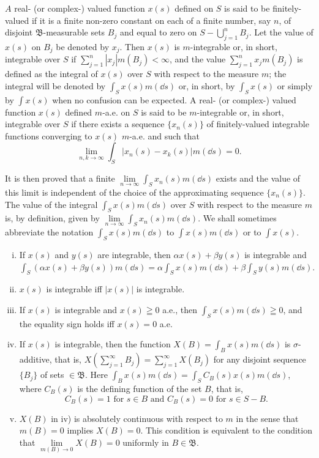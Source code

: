 
\begin{definitionu} $A$ real- (or complex-) valued function $x(s)$ defined on $S$ is said to be finitely-valued if it is a finite non-zero constant on each of a finite number, say $n$, of disjoint $\mathfrak{B}$-measurable sets $B_j$ and equal to zero on $S- \bigcup\limits_{j=1}^{n} B_j$. Let the value of $x(s)$ on $B_j$ be denoted by $x_j$. Then $x(s)$ is $m$-integrable or, in short, integrable over $S$ if $\sum\limits_{j=1}^{n} |x_j| m(B_j) < \infty$, and the value $\sum\limits_{j=1}^{n} x_j m(B_j)$ is defined as the integral of $x(s)$ over $S$ with respect to the measure $m$; the integral will be denoted by $\int_S x(s) m(\dd s)$ 
or, in short, by $\int_{S} x(s)$ or simply by $\int x(s)$ when no confusion can be expected. A real- (or complex-) valued function $x(s)$ defined $m$-a.e. on $S$ is said to be $m$-integrable or, in short, integrable over $S$ if there exists a sequence $\{x_n(s)\}$ of finitely-valued integrable functions converging to $x(s)$ $m$-a.e. and such that 
\[
\lim\limits _{n, k \rightarrow \infty} \int_{S} | x _{n} (s)- x _{k} (s) | m(\dd s) = 0.
\]
\end{definitionu}

It is then proved that a finite $\lim\limits_{n\to\infty}\int_{S}x_{n}(s)m(\dd s)$ exists and the value of this limit is independent of the choice of the approximating sequence $\{x_{n}(s)\}$. The value of the integral $\int_{S}x(s)m(\dd s)$ over $S$ with respect to the measure $m$ is, by definition, given by $\lim\limits_{n\to\infty}\int_{S}x_{n}(s)m(\dd s)$. We shall sometimes abbreviate the notation $\int_{S}x(s)m(\dd s)$ to $\int x(s)m(\dd s)$ or to $\int x(s)$. 


\begin{enumerate}[i)]
 \item If $x(s)$ and $y(s)$ are integrable, then $\alpha x(s) + \beta y(s)$ is integrable and $\int_{S} (\alpha x(s) + \beta y(s)) m(\dd s) = \alpha \int_{S} x(s) m(\dd s) + \beta \int_{S} y(s) m(\dd s).$ 
 \item $x(s)$ is integrable iff $|x(s)|$ is integrable. 
 \item If $x(s)$ is integrable and $x(s) \geqq 0$ a.e., then $\int_{S} x(s) m(\dd s) \geqq 0$, and the equality sign holds iff $x(s) = 0$ a.e. 
 \item If $x(s)$ is integrable, then the function $X(B) = \int_{B} x(s) m(\dd s)$ is $\sigma$-additive, that is, $X\left(\sum\limits_{j=1}^{\infty} B_j\right) = \sum\limits_{j=1}^{\infty} X(B_j)$ for any disjoint sequence $\{B_j\}$ of sets $\in \mathfrak{B}$. Here $\int_{B} x(s) m(\dd s) = \int_{S} C_B(s) x(s) m(\dd s)$, where $C_B(s)$ is the defining function of the set $B$, that is, 
 \[
 C _{B} (s) = 1 \text{ for } s \in B \text{ and } C _{B} (s) = 0 \text{ for } s \in S- B.
 \]
 \item $X(B)$ in iv) is absolutely continuous with respect to $m$ in the sense that $m(B) = 0$ implies $X(B) = 0$. This condition is equivalent to the condition that $\lim\limits_{m(B) \to 0} X(B) = 0$ uniformly in $B \in \mathfrak{B}$. 
\end{enumerate}

